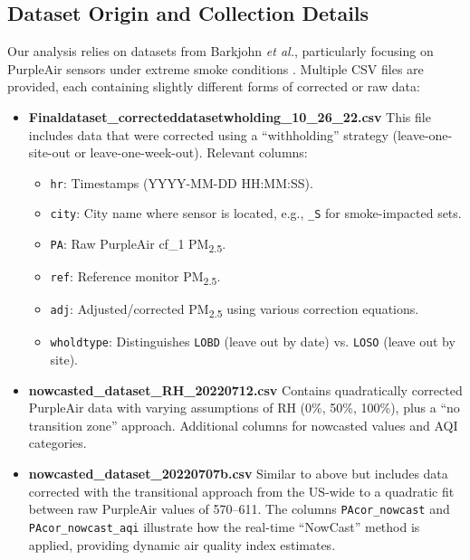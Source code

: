 \documentclass[12pt]{article}                                %
\begin{document}
\subsection{Dataset Origin and Collection Details}    %
Our analysis relies on datasets from Barkjohn \emph{et al.}, particularly focusing on PurpleAir 
sensors under extreme smoke conditions \cite{Barkjohn2022Sensors}. Multiple CSV files are provided, 
each containing slightly different forms of corrected or raw data:

\begin{itemize}
\item \textbf{Finaldataset\_correcteddatasetwholding\_10\_26\_22.csv}  
      This file includes data that were corrected using a “withholding” strategy (leave-one-site-out 
      or leave-one-week-out). Relevant columns:
      \begin{itemize}
         \item \texttt{hr}: Timestamps (YYYY-MM-DD HH:MM:SS).
         \item \texttt{city}: City name where sensor is located, e.g., \texttt{\_S} for smoke-impacted sets.
         \item \texttt{PA}: Raw PurpleAir cf\_1 PM\textsubscript{2.5}.
         \item \texttt{ref}: Reference monitor PM\textsubscript{2.5}.
         \item \texttt{adj}: Adjusted/corrected PM\textsubscript{2.5} using various correction equations.
         \item \texttt{wholdtype}: Distinguishes \texttt{LOBD} (leave out by date) vs. \texttt{LOSO} (leave out by site).
      \end{itemize}

\item \textbf{nowcasted\_dataset\_RH\_20220712.csv}  
    Contains quadratically corrected PurpleAir data with varying assumptions of RH (0\%, 50\%, 100\%), 
    plus a “no transition zone” approach. Additional columns for nowcasted values and AQI categories.

\item \textbf{nowcasted\_dataset\_20220707b.csv}  
    Similar to above but includes data corrected with the transitional approach from the US-wide 
    to a quadratic fit between raw PurpleAir values of 570--611. The columns 
    \texttt{PAcor\_nowcast} and \texttt{PAcor\_nowcast\_aqi} illustrate how the real-time 
    “NowCast” method is applied, providing dynamic air quality index estimates.


\end{itemize}
\end{document}
